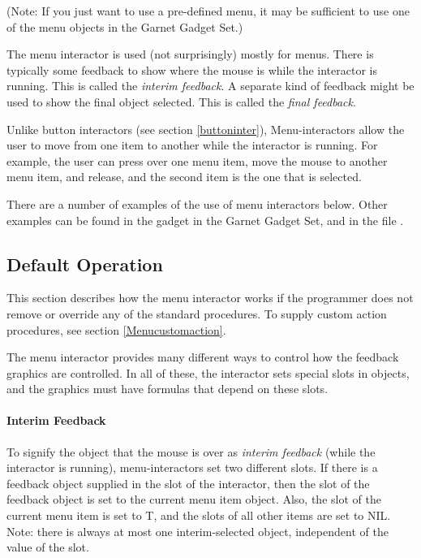 (Note: If you just want to use a pre-defined menu, it may be sufficient to use
one of the menu objects in the Garnet Gadget Set.)

The menu interactor is used (not surprisingly) mostly for menus.
There is
typically some feedback to show where the mouse is while the interactor is
running.  This is called the {\it interim feedback}.  A separate kind of
feedback might be used to show the final object selected.  This is called
the {\it final feedback}.

Unlike button interactors (see section \ref{buttoninter}), Menu-interactors
allow the user to move from one item to another while the interactor is
running.  For example, the user can press over one menu item, move the
mouse to another menu item, and release, and the second item is the one
that is selected.

There are a number of examples of the use of menu interactors below.  Other
examples can be found in the  gadget in the Garnet
Gadget Set, and in the file .

\subsection{Default Operation}

This section describes how the menu interactor works
if the programmer does not remove or override any of the standard
 procedures.  To supply custom action procedures, see section
\ref{Menucustomaction}.

The menu interactor provides many different ways to control how the
feedback graphics are controlled.  In all of these, the interactor sets
special slots in objects, and the graphics must have formulas that depend
on these slots.

\paragraph{Interim Feedback}
\label{menuinterimfeedback}

To signify the object that the mouse is over as {\it interim feedback} (while
the interactor is running), menu-interactors set two different slots.  If
there is a feedback object supplied in the  slot of the
interactor, then the  slot of the feedback object is set to
the current menu item
object.  Also, the  slot of the current menu item is
set to T, and the   slots of all other items are set
to NIL.  Note: there is always at most one interim-selected object,
independent of the value of the  slot.

